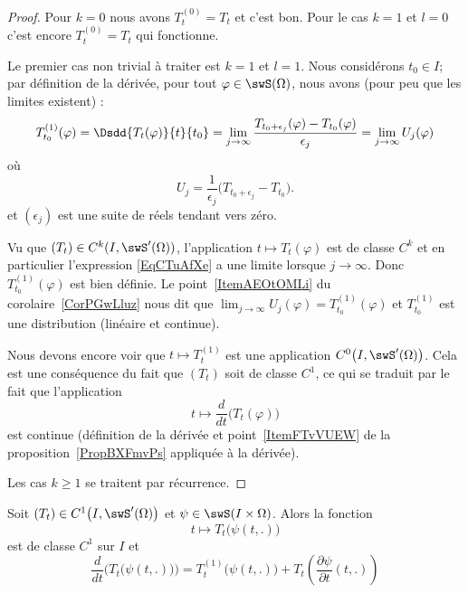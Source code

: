 \begin{proof}
	Pour \( k=0\) nous avons \( T^{(0)}_t=T_t\) et c'est bon. Pour le cas \( k=1\) et \( l=0\) c'est encore \( T_t^{(0)}=T_t\) qui fonctionne.

	Le premier cas non trivial à traiter est \( k=1\) et \( l=1\). Nous considérons \( t_0\in I\); par définition de la dérivée, pour tout \( \varphi\in\swS(\Omega)\), nous avons (pour peu que les limites existent) :
	\begin{equation}    \label{EqCTuAfXe}
		T^{(1)}_{t_0}(\varphi)=  \Dsdd{ T_t(\varphi) }{t}{t_0}=\lim_{j\to \infty} \frac{ T_{t_0+\epsilon_j}(\varphi)-T_{t_0}(\varphi) }{ \epsilon_j }= \lim_{j\to \infty} U_j(\varphi)
	\end{equation}
	où
	\begin{equation}
		U_j=\frac{1}{ \epsilon_j }\big( T_{t_0+\epsilon_j}-T_{t_0} \big).
	\end{equation}
	et \( (\epsilon_j)\) est une suite de réels tendant vers zéro.

	Vu que \( (T_t)\in C^k(I,\swS'(\Omega))\), l'application \( t\mapsto T_t(\varphi)\) est de classe \( C^k\) et en particulier l'expression \eqref{EqCTuAfXe} a une limite lorsque \( j\to \infty\). Donc \( T^{(1)}_{t_0}(\varphi)\) est bien définie. Le point~\ref{ItemAEOtOMLi} du corolaire~\ref{CorPGwLluz} nous dit que \( \lim_{j\to \infty} U_j(\varphi)= T_{t_0}^{(1)}(\varphi)\) et \( T_{t_0}^{(1)}\) est une distribution (linéaire et continue).

	Nous devons encore voir que \( t\mapsto T^{(1)}_t\) est une application \( C^0\big( I,\swS'(\Omega) \big)\). Cela est une conséquence du fait que \( (T_t)\) soit de classe \( C^1\), ce qui se traduit par le fait que l'application
	\begin{equation}
		t\mapsto \frac{ d }{ dt }\Big( T_t(\varphi) \Big)
	\end{equation}
	est continue (définition de la dérivée et point~\ref{ItemFTvVUEW} de la proposition~\ref{PropBXFmvPs} appliquée à la dérivée).

	Les cas \( k\geq 1\) se traitent par récurrence.
\end{proof}

\begin{proposition} \label{PropUDkgksG}
	Soit \( (T_t)\in C^1\big( I,\swS'(\Omega) \big)\) et \( \psi\in\swS(I\times \Omega)\). Alors la fonction
	\begin{equation}
		t\mapsto T_t\big( \psi(t,.) \big)
	\end{equation}
	est de classe \( C^1\) sur \( I\) et
	\begin{equation}    \label{EqSCNYYhE}
		\frac{ d }{ dt }\Big( T_t\big( \psi(t,.) \big) \Big)=T_t^{(1)}\big( \psi(t,.) \big)+T_t\left( \frac{ \partial \psi }{ \partial t }(t,.) \right)
	\end{equation}
\end{proposition}

